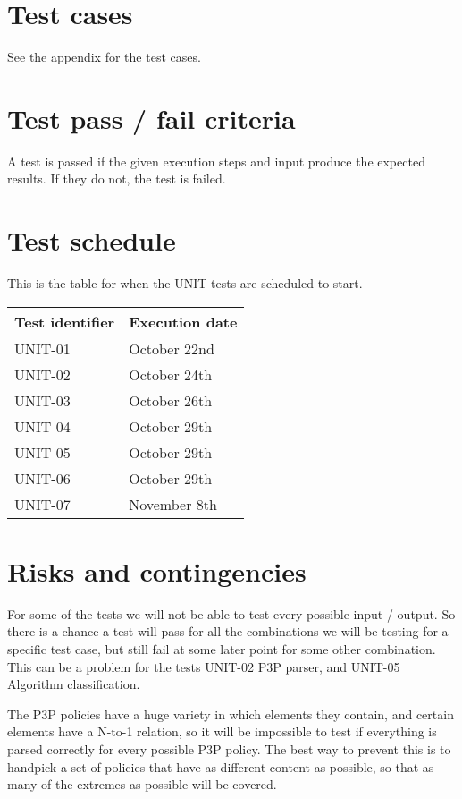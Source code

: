 	\section{Test cases}
		See the appendix for the test cases.

	\section{Test pass / fail criteria}
		A test is passed if the given execution steps and input produce the expected results. If they do not, the test is failed.

	\section {Test schedule}
		This is the table for when the UNIT tests are scheduled to start.

		\begin{center}
			\begin{tabular}{ |  p{5cm} | p{5cm} | }
				\hline
				Test identifier & Execution date \\ [3pt] \hline \hline
				UNIT-01 & October 22nd \\  [3pt] \hline
				UNIT-02 & October 24th \\  [3pt] \hline
				UNIT-03 & October 26th \\  [3pt] \hline
				UNIT-04 & October 29th \\  [3pt] \hline
				UNIT-05 & October 29th \\  [3pt] \hline
				UNIT-06 & October 29th \\  [3pt] \hline
				UNIT-07 & November 8th \\  [3pt] \hline
			\end{tabular}
		\end{center}

\section{Risks and contingencies}
For some of the tests we will not be able to test every possible input / output. So there is a chance a test will pass for all the combinations we will be testing for a specific test case, but still fail at some later point for some other combination. This can be a problem for the tests UNIT-02 P3P parser, and UNIT-05 Algorithm classification.

The P3P policies have a huge variety in which elements they contain, and certain elements have a N-to-1 relation, so it will be impossible to test if everything is parsed correctly for every possible P3P policy. The best way to prevent this is to handpick a set of policies that have as different content as possible, so that as many of the extremes as possible will be covered.


